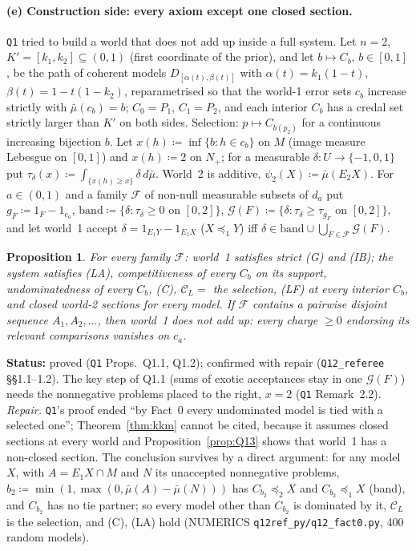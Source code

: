 \documentclass[11pt]{article}
\newtheorem{proposition}[theorem]{Proposition}
\theoremstyle{definition}
\theoremstyle{remark}
\newcommand{\C}{\mathcal C}
\newcommand{\src}[1]{\texttt{#1}}
\newcommand{\status}[1]{\par\smallskip\noindent\textbf{Status:} #1\par\smallskip}
\begin{document}
\paragraph{(e) Construction side: every axiom except one closed section.} \src{Q1} tried to build a world that does not add up inside a full system. Let $n=2$, $K'=[k_1,k_2]\subseteq(0,1)$ (first coordinate of the prior), and let $b\mapsto C_b$, $b\in[0,1]$, be the path of coherent models $D_{[\alpha(t),\beta(t)]}$ with $\alpha(t)=k_1(1-t)$, $\beta(t)=1-t(1-k_2)$, reparametrised so that the world-1 error sets $c_b$ increase strictly with $\bar\mu(c_b)=b$; $C_0=P_1$, $C_1=P_2$, and each interior $C_b$ has a credal set strictly larger than $K'$ on both sides. Selection: $p\mapsto C_{b(p_2)}$ for a continuous increasing bijection $b$. Let $x(h)\coloneqq\inf\{b:h\in c_b\}$ on $M$ (image measure Lebesgue on $[0,1]$) and $x(h)\coloneqq2$ on $N_+$; for a measurable $\delta:U\to\{-1,0,1\}$ put $\tau_\delta(x)\coloneqq\int_{\{x(h)\ge x\}}\delta\,d\bar\mu$. World~2 is additive, $\psi_2(X)\coloneqq\bar\mu(E_2X)$. For $a\in(0,1)$ and a family $\mathcal F$ of non-null measurable subsets of $d_a$ put $g_F\coloneqq1_F-1_{c_a}$, $\mathrm{band}\coloneqq\{\delta:\tau_\delta\ge0\text{ on }[0,2]\}$, $\mathcal G(F)\coloneqq\{\delta:\tau_\delta\ge\tau_{g_F}\text{ on }[0,2]\}$, and let world~1 accept $\delta=1_{E_1Y}-1_{E_1X}$ ($X\preceq_1Y$) iff $\delta\in\mathrm{band}\cup\bigcup_{F\in\mathcal F}\mathcal G(F)$.

\begin{proposition}\label{prop:Q12}
For every family $\mathcal F$: world~1 satisfies strict (G) and (IB); the system satisfies (LA), competitiveness of every $C_b$ on its support, undominatedness of every $C_b$, (C), $\C_L=$ the selection, (LF) at every interior $C_b$, and closed world-2 sections for every model. If $\mathcal F$ contains a pairwise disjoint sequence $A_1,A_2,\dots$, then world~1 does not add up: every charge $\ge0$ endorsing its relevant comparisons vanishes on $c_a$.
\end{proposition}
\status{proved (\src{Q1} Props.~Q1.1, Q1.2); confirmed with repair (\src{Q12\_referee} \S\S1.1--1.2). The key step of Q1.1 (sums of exotic acceptances stay in one $\mathcal G(F)$) needs the nonnegative problems placed to the right, $x=2$ (\src{Q1} Remark~2.2). \emph{Repair.} \src{Q1}'s proof ended ``by Fact~0 every undominated model is tied with a selected one''; Theorem~\ref{thm:kkm} cannot be cited, because it assumes closed sections at every world and Proposition~\ref{prop:Q13} shows that world~1 has a non-closed section. The conclusion survives by a direct argument: for any model $X$, with $A=E_1X\cap M$ and $N$ its unaccepted nonnegative problems, $b_2\coloneqq\min(1,\max(0,\bar\mu(A)-\bar\mu(N)))$ has $C_{b_2}\preceq_2X$ and $C_{b_2}\preceq_1X$ (band), and $C_{b_2}$ has no tie partner; so every model other than $C_{b_2}$ is dominated by it, $\C_L$ is the selection, and (C), (LA) hold (NUMERICS \src{q12ref\_py/q12\_fact0.py}, 400 random models).}
\end{document}
